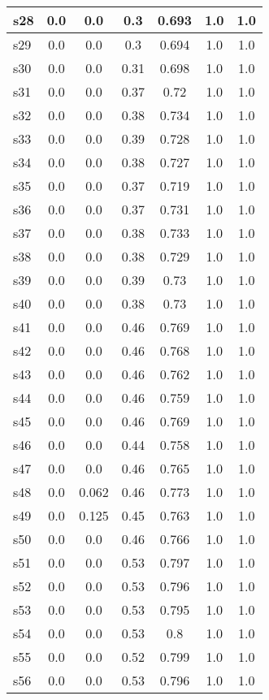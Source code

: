 \documentclass{article}
\begin{document}
\begin{tabular}{|l|c|c|c|c|c|c|}
\hline
s28 &0.0 & 0.0 & 0.3 & 0.693 & 1.0 & 1.0\\
\hline
s29 &0.0 & 0.0 & 0.3 & 0.694 & 1.0 & 1.0\\
\hline
s30 &0.0 & 0.0 & 0.31 & 0.698 & 1.0 & 1.0\\
\hline
s31 &0.0 & 0.0 & 0.37 & 0.72 & 1.0 & 1.0\\
\hline
s32 &0.0 & 0.0 & 0.38 & 0.734 & 1.0 & 1.0\\
\hline
s33 &0.0 & 0.0 & 0.39 & 0.728 & 1.0 & 1.0\\
\hline
s34 &0.0 & 0.0 & 0.38 & 0.727 & 1.0 & 1.0\\
\hline
s35 &0.0 & 0.0 & 0.37 & 0.719 & 1.0 & 1.0\\
\hline
s36 &0.0 & 0.0 & 0.37 & 0.731 & 1.0 & 1.0\\
\hline
s37 &0.0 & 0.0 & 0.38 & 0.733 & 1.0 & 1.0\\
\hline
s38 &0.0 & 0.0 & 0.38 & 0.729 & 1.0 & 1.0\\
\hline
s39 &0.0 & 0.0 & 0.39 & 0.73 & 1.0 & 1.0\\
\hline
s40 &0.0 & 0.0 & 0.38 & 0.73 & 1.0 & 1.0\\
\hline
s41 &0.0 & 0.0 & 0.46 & 0.769 & 1.0 & 1.0\\
\hline
s42 &0.0 & 0.0 & 0.46 & 0.768 & 1.0 & 1.0\\
\hline
s43 &0.0 & 0.0 & 0.46 & 0.762 & 1.0 & 1.0\\
\hline
s44 &0.0 & 0.0 & 0.46 & 0.759 & 1.0 & 1.0\\
\hline
s45 &0.0 & 0.0 & 0.46 & 0.769 & 1.0 & 1.0\\
\hline
s46 &0.0 & 0.0 & 0.44 & 0.758 & 1.0 & 1.0\\
\hline
s47 &0.0 & 0.0 & 0.46 & 0.765 & 1.0 & 1.0\\
\hline
s48 &0.0 & 0.062 & 0.46 & 0.773 & 1.0 & 1.0\\
\hline
s49 &0.0 & 0.125 & 0.45 & 0.763 & 1.0 & 1.0\\
\hline
s50 &0.0 & 0.0 & 0.46 & 0.766 & 1.0 & 1.0\\
\hline
s51 &0.0 & 0.0 & 0.53 & 0.797 & 1.0 & 1.0\\
\hline
s52 &0.0 & 0.0 & 0.53 & 0.796 & 1.0 & 1.0\\
\hline
s53 &0.0 & 0.0 & 0.53 & 0.795 & 1.0 & 1.0\\
\hline
s54 &0.0 & 0.0 & 0.53 & 0.8 & 1.0 & 1.0\\
\hline
s55 &0.0 & 0.0 & 0.52 & 0.799 & 1.0 & 1.0\\
\hline
s56 &0.0 & 0.0 & 0.53 & 0.796 & 1.0 & 1.0\\

\end{tabular}
\end{document}
